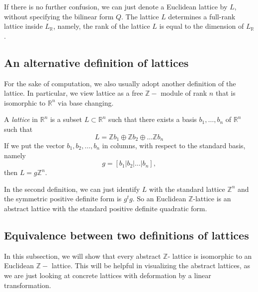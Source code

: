 If there is no further confusion, we can just denote a Euclidean lattice by $L$, without specifying the bilinear form
$Q$. The lattice $L$ determines a full-rank lattice inside $L_\mathbb{R}$, namely, the rank
of the lattice $L$ is equal to the dimension of $L_\mathbb{R}$.

\subsection{An alternative definition of lattices}
For the sake of computation, we also usually adopt another definition of the lattice.
In particular, we view lattice as a free $\mathbb{Z}-$ module of rank $n$ that is isomorphic
to $\mathbb{R}^n$ via base changing.
\begin{definition}\label{lattice2}
    A \textit{lattice} in $\mathbb{R}^n$ is a subset $L \subset \mathbb{R}^n$ such that there exists
    a basis $b_1,\ldots,b_n$ of $\mathbb{R}^n$ such that
    \[L = \mathbb{Z}b_1\oplus \mathbb{Z}b_2\oplus \ldots \mathbb{Z}b_n\]
    If we put the vector $b_1,b_2,\ldots,b_n$ in columns, with respect to the standard basis, namely
    \[g = [b_1 | b_2 | \ldots | b_n] ,\]
    then $L = g\mathbb{Z}^n$.
\end{definition}
In the second definition, we can just identify $L$ with the standard lattice $\mathbb{Z}^n$ and the
symmetric positive definite form is $g^tg$. So an Euclidean $\mathbb{Z}$-lattice is an abstract lattice with the standard
positive definite quadratic form.
\subsection{Equivalence between two definitions of lattices}
In this subsection, we will show that every abstract $\mathbb{Z}$- lattice is isomorphic to an Euclidean $\mathbb{Z}-$ lattice.
This will be helpful in visualizing the abstract lattices, as we are just looking at concrete lattices with deformation by a linear transformation.

